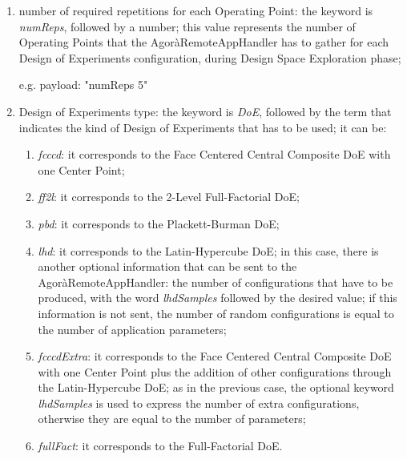 \begin{enumerate}

    \item number of required repetitions for each Operating Point: the keyword is \textit{numReps}, followed by a number; this value represents the number of Operating Points that the AgoràRemoteAppHandler has to gather for each Design of Experiments configuration, during Design Space Exploration phase;
    
    e.g. payload: "numReps 5"
    
    \item Design of Experiments type: the keyword is \textit{DoE}, followed by the term that indicates the kind of Design of Experiments that has to be used; it can be:
    
    \begin{enumerate}
    
        \item \textit{fcccd}: it corresponds to the Face Centered Central Composite DoE with one Center Point;
        
        \item \textit{ff2l}: it corresponds to the 2-Level Full-Factorial DoE;
        
        \item \textit{pbd}: it corresponds to the Plackett-Burman DoE;
        
        \item \textit{lhd}: it corresponds to the Latin-Hypercube DoE; in this case, there is another optional information that can be sent to the AgoràRemoteAppHandler: the number of configurations that have to be produced, with the word \textit{lhdSamples} followed by the desired value; if this information is not sent, the number of random configurations is equal to the number of application parameters;
        
        \item \textit{fcccdExtra}: it corresponds to the Face Centered Central Composite DoE with one Center Point plus the addition of other configurations through the Latin-Hypercube DoE; as in the previous case, the optional keyword \textit{lhdSamples} is used to express the number of extra configurations, otherwise they are equal to the number of parameters;
        
        \item \textit{fullFact}: it corresponds to the Full-Factorial DoE.
    
    \end{enumerate}
    

\end{enumerate}
